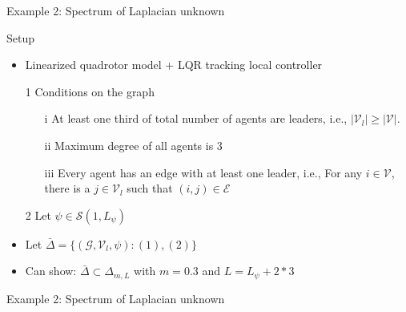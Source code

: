 \documentclass{beamer}
\begin{document}
\begin{frame}{Example 2: Spectrum of Laplacian unknown}
	\begin{block}{Setup}
		\begin{itemize}
			\item Linearized quadrotor model + LQR tracking local controller
			\item[1] Conditions on the graph
			\begin{itemize}
				\item[i] At least one third of total number of agents are leaders, i.e., $|\mathcal{V}_l|\geq |\mathcal{V}|$.
				\item[ii] Maximum degree of all agents is $3$				
				\item[iii] Every agent has an edge with at least one leader, i.e., For any $i \in \mathcal{V}$, there is a $j \in \mathcal{V}_l$ such that $(i,j) \in \mathcal{E}$
			\end{itemize}
			\item[2] Let $\psi \in \mathcal{S}(1,L_{\psi})$	
			\item Let $\bar{\Delta}=\{(\mathcal{G},\mathcal{V}_l,\psi): (1),(2)\}$	
			\item Can show: $\bar{\Delta}\subset \Delta_{m,L}$ with $m=0.3$ and $L=L_{\psi}+2*3$				
		\end{itemize}
	\end{block}
\end{frame}
\begin{frame}{Example 2: Spectrum of Laplacian unknown}
	\begin{figure}[t]
		
		\centering
	\end{figure}
\end{frame}
\end{document}

